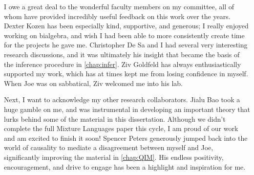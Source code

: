 %
%




I owe a great deal to the wonderful faculty members on my committee, 
    all of whom have provided incredibly useful feedback on this work over the years. 
Dexter Kozen has been especially kind, supportive, and generous;  
    I really enjoyed working on bialgebra, 
    and wish I had been able to more consistently create time for the projects he gave me.
Christopher De Sa 
    and I had several very interesting research discussions,
    and it was ultimately his insight that became the basis of the inference procedure in \cref{chap:infer}. 
Ziv Goldfeld has always enthusiastically supported my work, 
        which has at times kept me from losing confidence in myself. 
    When Joe was on sabbatical, Ziv welcomed me into his lab. 


Next, I want to acknowledge my other research collaborators.
Jialu Bao
    took a huge gamble on me, and was instrumental in developing an important theory that lurks behind some of the material in this dissertation.
    Although we didn't complete the full Mixture Languages paper this cycle,
        I am proud of our work and am excited to finish it soon!
Spencer Peters
    generously jumped back into the world of causality to 
    mediate a disagreement between myself and Joe,
    significantly improving 
        the material in \cref{chap:QIM}.
His endless positivity, encouragement, and drive to engage has been a highlight and inspiration for me.  



